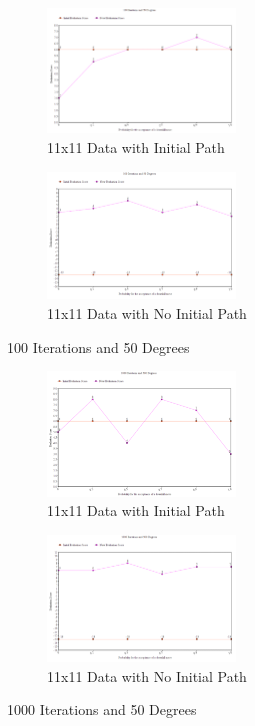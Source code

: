 \documentclass[11pt, oneside]{article}   	%
\begin{document}
\begin{figure}[H]
\centering
\begin{subfigure}{.5\textwidth}
	\centering
	\includegraphics[width=50mm]{11x11lowIlowT.png}
	\caption{11x11 Data with Initial Path}
	\label{fig:method}
\end{subfigure}%
\begin{subfigure}{.5\textwidth}
	\centering
	\includegraphics[width=50mm]{11x11lowIlowTPath.png}
	\caption{11x11 Data with No Initial Path}
	\label{fig:method}
\end{subfigure}
\caption{100 Iterations and 50 Degrees}
\end{figure}

\begin{figure}[H]
\centering
\begin{subfigure}{.5\textwidth}
	\centering
	\includegraphics[width=50mm]{11x11highIhighT.png}
	\caption{11x11 Data with Initial Path}
	\label{fig:method}
\end{subfigure}%
\begin{subfigure}{.5\textwidth}
	\centering
	\includegraphics[width=50mm]{11x11highIhighTPath.png}
	\caption{11x11 Data with No Initial Path}
	\label{fig:method}
\end{subfigure}
\caption{1000 Iterations and 50 Degrees}
\end{figure}
\end{document}
